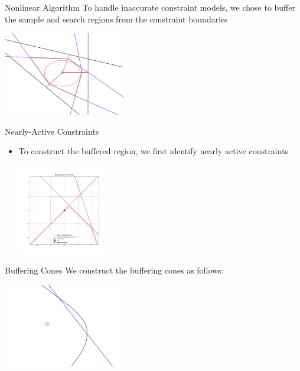 \documentclass{beamer}
\begin{document}
\begin{frame}{Nonlinear Algorithm}
	To handle inaccurate constraint models, 
	we chose to buffer the sample and search regions from the constraint boundaries
	
	\begin{center}
		\includegraphics[width=200px]{images/completed_2.png}
	\end{center}
	
\end{frame}

\begin{frame}{Nearly-Active Constraints}
	\begin{itemize}
		\item To construct the buffered region, we first identify nearly active constraints
		\begin{center}
			\includegraphics[width=150px]{images/active_constraints.png}
		\end{center}
	\end{itemize}
\end{frame}

\begin{frame}{Buffering Cones}
	We construct the buffering cones as follows:
	\begin{center}
		\includegraphics[width=200px]{images/explanation_1.png}
	\end{center}
\end{frame}
\end{document}
